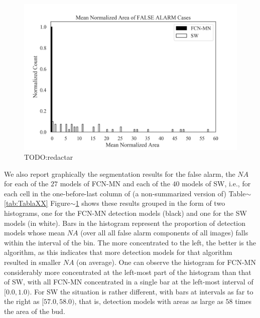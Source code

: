 \documentclass[a4paper,authoryear,review]{elsarticle}
\begin{document}









\begin{figure}%
    \centering
      \includegraphics[width=\textwidth]{figures/AAA_mean_relative_area_fcn_vs_sw.png}%
\caption{TODO:redactar}
\label{fig:AAA}
\end{figure}

We also report graphically the segmentation results for the false alarm, the $NA$  for each of the $27$ models of FCN-MN and each of the $40$ models of SW, i.e., for each cell in the  one-before-last column of (a non-summarized version of) Table$\sim$\ref{tab:TablaXX}
%
Figure$\sim$\ref{fig:AAA} shows these results grouped in the form of two histograms, one for the FCN-MN detection models (black) and one for the SW models (in white). Bars in the histogram represent the proportion of detection models whose mean $NA$ (over all all false alarm components of all images) falls within the interval of the bin. The more concentrated to the left, the better is the algorithm, as this indicates that more detection models for that algorithm resulted in smaller $NA$ (on average).
%
One can observe the histogram for FCN-MN considerably more concentrated at the left-most part of the histogram than that of SW, with all FCN-MN concentrated in a single bar at the left-most interval of  $[0.0, 1.0)$. For SW the situation is rather different, with bars at intervals as far to the right as $[57.0, 58.0)$, that is, detection models with areas as large as $58$ times the area of the bud. 
%
\end{document}

